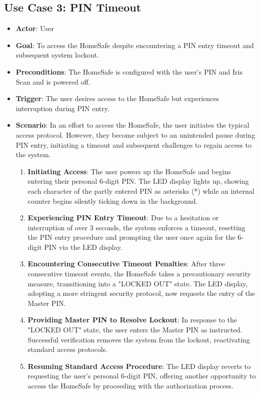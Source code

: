 \documentclass{article}
\begin{document}
\subsection{Use Case 3: PIN Timeout}
\begin{itemize}
    \item \textbf{Actor}: User
    \item \textbf{Goal}: To access the HomeSafe despite encountering a PIN entry timeout and subsequent system lockout.
    \item \textbf{Preconditions}: The HomeSafe is configured with the user’s PIN and Iris Scan and is powered off.
    \item \textbf{Trigger}: The user desires access to the HomeSafe but experiences interruption during PIN entry.
    \item \textbf{Scenario}: In an effort to access the HomeSafe, the user initiates the typical access protocol. However, they become subject to an unintended pause during PIN entry, initiating a timeout and subsequent challenges to regain access to the system.
    \begin{enumerate}
    \item \textbf{Initiating Access}: The user powers up the HomeSafe and begins entering their personal 6-digit PIN. The LED display lights up, showing each character of the partly entered PIN as asterisks (*) while an internal counter begins silently ticking down in the background.
    \item \textbf{Experiencing PIN Entry Timeout}: Due to a hesitation or interruption of over 3 seconds, the system enforces a timeout, resetting the PIN entry procedure and prompting the user once again for the 6-digit PIN via the LED display.
    \item \textbf{Encountering Consecutive Timeout Penalties}: After three consecutive timeout events, the HomeSafe takes a precautionary security measure, transitioning into a "LOCKED OUT" state. The LED display, adopting a more stringent security protocol, now requests the entry of the Master PIN.
    \item \textbf{Providing Master PIN to Resolve Lockout}:  In response to the "LOCKED OUT" state, the user enters the Master PIN as instructed. Successful verification removes the system from the lockout, reactivating standard access protocols.
    \item \textbf{Resuming Standard Access Procedure}: The LED display reverts to requesting the user’s personal 6-digit PIN, offering another opportunity to access the HomeSafe by proceeding with the authorization process.
    \end{enumerate}
\end{itemize}
\end{document}
